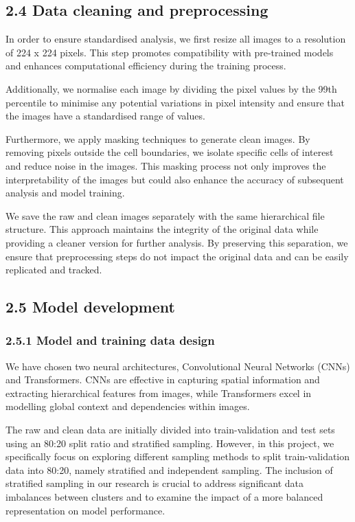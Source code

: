 \documentclass[letterpaper,9pt,twocolumn,twoside,]{pinp}
\begin{document}
\hypertarget{data-cleaning-and-preprocessing}{%
\subsection{2.4 Data cleaning and
preprocessing}\label{data-cleaning-and-preprocessing}}

In order to ensure standardised analysis, we first resize all images to
a resolution of 224 x 224 pixels. This step promotes compatibility with
pre-trained models and enhances computational efficiency during the
training process.

Additionally, we normalise each image by dividing the pixel values by
the 99th percentile to minimise any potential variations in pixel
intensity and ensure that the images have a standardised range of
values.

Furthermore, we apply masking techniques to generate clean images. By
removing pixels outside the cell boundaries, we isolate specific cells
of interest and reduce noise in the images. This masking process not
only improves the interpretability of the images but could also enhance
the accuracy of subsequent analysis and model training.

We save the raw and clean images separately with the same hierarchical
file structure. This approach maintains the integrity of the original
data while providing a cleaner version for further analysis. By
preserving this separation, we ensure that preprocessing steps do not
impact the original data and can be easily replicated and tracked.

\hypertarget{model-development}{%
\subsection{2.5 Model development}\label{model-development}}

\hypertarget{model-and-training-data-design}{%
\subsubsection{2.5.1 Model and training data
design}\label{model-and-training-data-design}}

We have chosen two neural architectures, Convolutional Neural Networks
(CNNs) and Transformers. CNNs are effective in capturing spatial
information and extracting hierarchical features from images, while
Transformers excel in modelling global context and dependencies within
images.

The raw and clean data are initially divided into train-validation and
test sets using an 80:20 split ratio and stratified sampling. However,
in this project, we specifically focus on exploring different sampling
methods to split train-validation data into 80:20, namely stratified and
independent sampling. The inclusion of stratified sampling in our
research is crucial to address significant data imbalances between
clusters and to examine the impact of a more balanced representation on
model performance.
\end{document}
